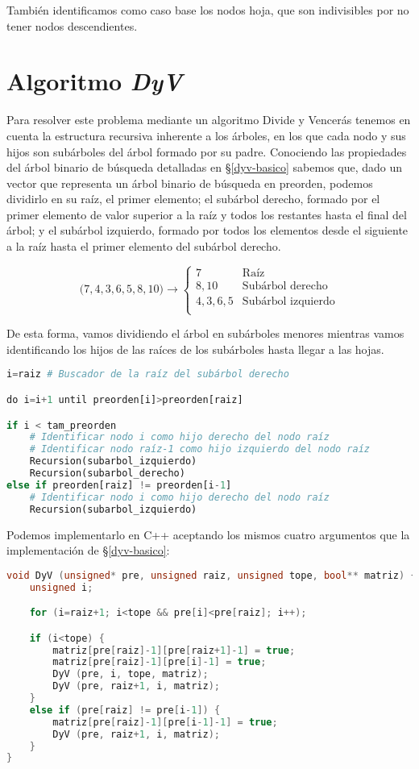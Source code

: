 También identificamos como caso base los nodos hoja, que son indivisibles por no  tener nodos descendientes.

\section{Algoritmo \textit{DyV}}\label{dyv-dyv}

Para resolver este problema mediante un algoritmo Divide y Vencerás tenemos en cuenta la estructura recursiva inherente a los árboles, en los que cada nodo y sus hijos son subárboles del árbol formado por su padre.
Conociendo las propiedades del árbol binario de búsqueda detalladas en \S\ref{dyv-basico} sabemos que, dado un vector que representa un árbol binario de búsqueda en preorden, podemos dividirlo en su raíz, el primer elemento; el subárbol derecho, formado por el primer elemento de valor superior a la raíz y todos los restantes hasta el final del árbol; y el subárbol izquierdo, formado por todos los elementos desde el siguiente a la raíz hasta el primer elemento del subárbol derecho.

\[
\Big(7, 4, 3, 6, 5, 8, 10\Big) \longrightarrow
\begin{cases}
	7          & \text{Raíz} \\
	8, 10      & \text{Subárbol derecho} \\
	4, 3, 6, 5 & \text{Subárbol izquierdo} \\
\end{cases}
\]

De esta forma, vamos dividiendo el árbol en subárboles menores mientras vamos identificando los hijos de las raíces de los subárboles hasta llegar a las hojas.

\begin{lstlisting}[language=Python]
i=raiz # Buscador de la raíz del subárbol derecho

do i=i+1 until preorden[i]>preorden[raiz]

if i < tam_preorden
	# Identificar nodo i como hijo derecho del nodo raíz
	# Identificar nodo raíz-1 como hijo izquierdo del nodo raíz
	Recursion(subarbol_izquierdo)
	Recursion(subarbol_derecho)
else if preorden[raiz] != preorden[i-1]
	# Identificar nodo i como hijo derecho del nodo raíz
	Recursion(subarbol_izquierdo)
\end{lstlisting}

Podemos implementarlo en C++ aceptando los mismos cuatro argumentos que la implementación de \S\ref{dyv-basico}:

\begin{lstlisting}[language=C++]
void DyV (unsigned* pre, unsigned raiz, unsigned tope, bool** matriz) {
	unsigned i;

	for (i=raiz+1; i<tope && pre[i]<pre[raiz]; i++);

	if (i<tope) {
		matriz[pre[raiz]-1][pre[raiz+1]-1] = true;
		matriz[pre[raiz]-1][pre[i]-1] = true;
		DyV (pre, i, tope, matriz);
		DyV (pre, raiz+1, i, matriz);
	}
	else if (pre[raiz] != pre[i-1]) {
		matriz[pre[raiz]-1][pre[i-1]-1] = true;
		DyV (pre, raiz+1, i, matriz);
	}
}
\end{lstlisting}

